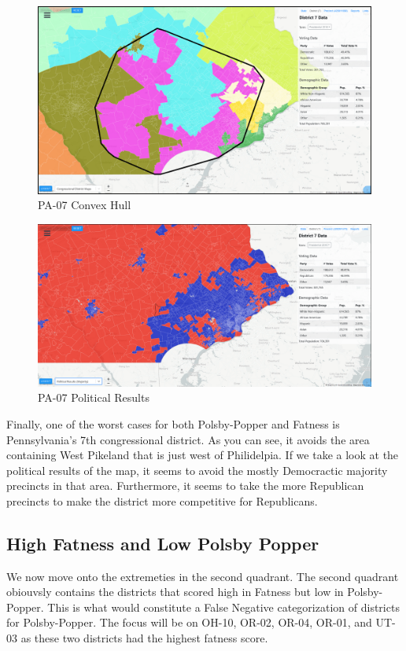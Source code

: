 \documentclass[letterpaper]{article}
\begin{document}
\begin{figure}[H]
	\includegraphics[width=\linewidth]{./figures/PA-07-ConvexHull.png}
	\caption{PA-07 Convex Hull}
	\label{fig:pa07ch}
\end{figure}

\begin{figure}[H]
	\includegraphics[width=\linewidth]{./figures/PA-07-PoliticalResults.png}
	\caption{PA-07 Political Results}
	\label{fig:pa07pr}
\end{figure}

Finally, one of the worst cases for both Polsby-Popper and Fatness is Pennsylvania's 7th congressional district. As you can see, it avoids the area containing West Pikeland that is just west of Philidelpia. If we take a look at the political results of the map, it seems to avoid the mostly Democractic majority precincts in that area. Furthermore, it seems to take the more Republican precincts to make the district more competitive for Republicans.

\subsection{High Fatness and Low Polsby Popper}
We now move onto the extremeties in the second quadrant. The second quadrant obiouvsly contains the districts that scored high in Fatness but low in Polsby-Popper. This is what would constitute a False Negative categorization of districts for Polsby-Popper. The focus will be on OH-10, OR-02, OR-04, OR-01, and UT-03 as these two districts had the highest fatness score.
\end{document}
